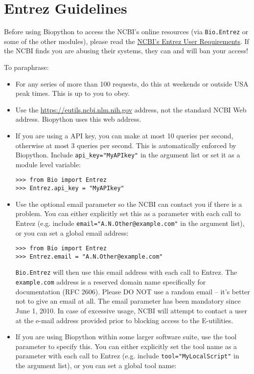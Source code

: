 \section{Entrez Guidelines}
\label{sec:entrez-guidelines}
Before using Biopython to access the NCBI's online resources (via \verb|Bio.Entrez| or some of the other modules), please read the
\href{https://www.ncbi.nlm.nih.gov/books/NBK25497/}{NCBI's Entrez User Requirements}.
If the NCBI finds you are abusing their systems, they can and will ban your access!

To paraphrase:

\begin{itemize}
\item For any series of more than 100 requests, do this at weekends or outside USA peak times.  This is up to you to obey.
\item Use the \url{https://eutils.ncbi.nlm.nih.gov} address, not the standard NCBI Web address.  Biopython uses this web address.
\item If you are using a API key, you can make at most 10 queries per second, otherwise at most 3 queries per second.
This is automatically enforced by Biopython.
Include \verb|api_key="MyAPIkey"| in the argument list or set it as a module level variable:
\begin{verbatim}
>>> from Bio import Entrez
>>> Entrez.api_key = "MyAPIkey"
\end{verbatim}
\item Use the optional email parameter so the NCBI can contact you if there is a problem.  You can either explicitly set this as a parameter with each call to Entrez (e.g. include \texttt{email="A.N.Other@example.com"} in the argument list), or you can set a global email address:

\begin{verbatim}
>>> from Bio import Entrez
>>> Entrez.email = "A.N.Other@example.com"
\end{verbatim}
\texttt{Bio.Entrez} will then use this email address with each call to Entrez.  The \texttt{example.com} address is a reserved domain name specifically for documentation (RFC 2606).  Please DO NOT use a random email -- it's better not to give an email at all. The email parameter has been mandatory since June 1, 2010. In case of excessive usage, NCBI will attempt to contact a user at the e-mail address provided prior to blocking access to the E-utilities.
\item If you are using Biopython within some larger software suite, use the tool parameter to specify this.  You can either explicitly set the tool name as a parameter with each call to Entrez (e.g. include \texttt{tool="MyLocalScript"} in the argument list), or you can set a global tool name:


\end{itemize}
